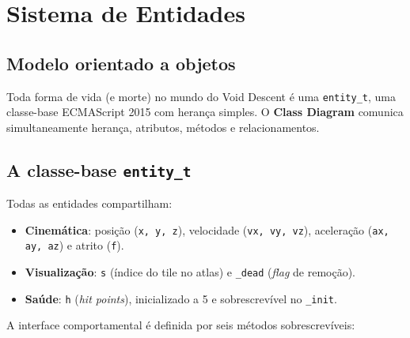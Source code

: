 \chapter{Sistema de Entidades}
\label{ch:entities}

\section{Modelo orientado a objetos}

Toda forma de vida (e morte) no mundo do Void Descent é uma \texttt{entity\_t}, uma
classe-base ECMAScript 2015 com herança simples. O \textbf{Class Diagram} comunica
simultaneamente herança, atributos, métodos e relacionamentos.


\section{A classe-base \texttt{entity\_t}}

Todas as entidades compartilham:

\begin{itemize}
  \item \textbf{Cinemática}: posição (\texttt{x, y, z}), velocidade
    (\texttt{vx, vy, vz}), aceleração (\texttt{ax, ay, az}) e atrito (\texttt{f}).
  \item \textbf{Visualização}: \texttt{s} (índice do tile no atlas) e \texttt{\_dead}
    (\emph{flag} de remoção).
  \item \textbf{Saúde}: \texttt{h} (\emph{hit points}), inicializado a 5 e
    sobrescrevível no \texttt{\_init}.
\end{itemize}

A interface comportamental é definida por seis métodos sobrescrevíveis:


